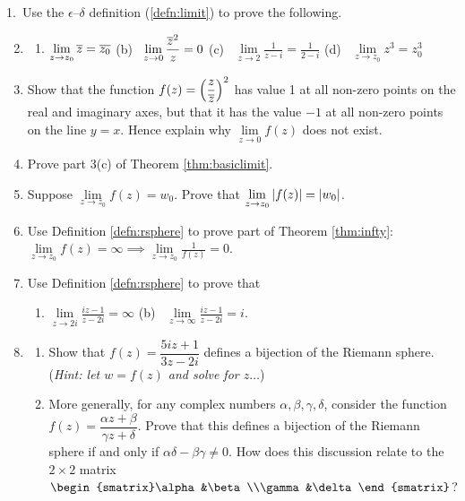 \clearpage


\begin{exercises*}{}{}
\hangindent\leftmargini
\textup{1.}\ Use the $\epsilon$--$\delta$ definition (\ref{defn:limit}) to prove the following.
\begin{enumerate}\setcounter{enumi}{1}
  \item[]\begin{enumerate}
  	\item $\displaystyle\lim\limits_{z\to z_0}\overline{z}=\overline{z_0}$\qquad
  	(b) \ $\displaystyle\lim\limits_{z\to 0}\frac{\overline{z}^2}z=0$\qquad
  	(c) \ $\displaystyle\lim\limits_{z\to 2}\frac 1{z-i}=\frac 1{2-i}$\qquad
  	(d) \ $\displaystyle\lim\limits_{z\to z_0}z^3=z_0^3$
  \end{enumerate}
  
  \item Show that the function $f(z)=\left(\dfrac z{\overline{z}}\right)^2$ has value 1 at all non-zero points on the real and imaginary axes, but that it has the value $-1$ at all non-zero points on the line $y=x$. Hence explain why $\lim\limits_{z\to 0}f(z)$ does not exist.
  
  \item Prove part 3(c) of Theorem \ref{thm:basiclimit}.
  
  \item Suppose $\lim\limits_{z\to z_0}f(z)=w_0$. Prove that $\lim\limits_{z\to z_0}\left| f(z)\right|=\left| w_0\right|$.
   
  \item Use Definition \ref{defn:rsphere} to prove part of Theorem \ref{thm:infty}: $\lim\limits_{z\to z_0}f(z)=\infty \implies \lim\limits_{z\to z_0}\frac 1{f(z)}=0$.
  
  \item Use Definition \ref{defn:rsphere} to prove that
  \begin{enumerate}
    \item $\displaystyle\lim\limits_{z\to 2i}\frac{iz-1}{z-2i}=\infty$ \qquad (b) \ $\displaystyle\lim\limits_{z\to\infty}\frac{iz-1}{z-2i}=i$.
  \end{enumerate}
  
 	\item\begin{enumerate}
    \item Show that $f(z)=\dfrac{5iz+1}{3z-2i}$ defines a bijection of the Riemann sphere.\\
  	(\emph{Hint: let $w=f(z)$ and solve for $z\ldots$})
  	\item More generally, for any complex numbers $\alpha,\beta,\gamma,\delta$, consider the function $f(z)=\dfrac{\alpha z+\beta}{\gamma z+\delta}$. Prove that this defines a bijection of the Riemann sphere if and only if $\alpha\delta-\beta\gamma\neq 0$. How does this discussion relate to the $2\times 2$ matrix $\begin{smatrix}\alpha&\beta\\\gamma&\delta\end{smatrix}$?
  \end{enumerate}
  

\end{enumerate}
\end{exercises*}
